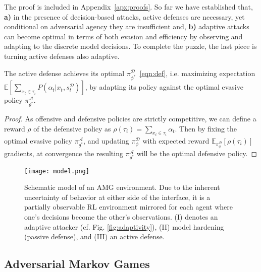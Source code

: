 

The proof is included in Appendix~\ref{apx:proofs}.
So far we have established that, \textbf{a)} in the presence of decision-based attacks, active defenses are necessary, yet conditional on adversarial agency they are insufficient and, \textbf{b)} adaptive attacks can become optimal in terms of both evasion and efficiency by observing and adapting to the discrete model decisions.
To complete the puzzle, the last piece is turning active defenses also adaptive.

\begin{corollary}
The active defense achieves its optimal $\pi_{\phi^*}^{\mathcal{D}}$~\eqref{eqn:def}, i.e. maximizing expectation $\mathbb{E}[\sum_{x_t \in \tau_i}P(\alpha_t|x_t,s^{\mathcal{D}}_t)]$, by adapting its policy against the optimal evasive policy ${\pi^\mathcal{A}_{\theta^*}}$.
\label{prop:3}
\end{corollary}

\begin{proof}
  As offensive and defensive policies are strictly competitive, we can define a reward $\rho$ of the defensive policy as $\rho(\tau_i) = \sum_{x_t \in \tau_i} \alpha_t$.
  Then by fixing the optimal evasive policy $\pi_{\theta^*}^\mathcal{A}$, and updating $\pi_\phi^{\mathcal{D}}$ with expected reward $\mathbb{E}_{\pi^\mathcal{D}_\phi}[\rho(\tau_i)]$ gradients, at convergence the resulting ${\pi^\mathcal{A}_{\theta^*}}$ will be the optimal defensive policy.
  \end{proof}

\begin{figure}
    \centering
    \texttt{[image: model.png]}
    \caption{Schematic model of an AMG environment. Due to the inherent uncertainty of behavior at either side of the interface, it is a partially observable RL environment mirrored for each agent where one's decisions become the other's observations. (I) denotes an adaptive attacker (cf. Fig. \ref{fig:adaptivity}), (II) model hardening (passive defense), and (III) an active defense.}
    \label{fig:model}
\end{figure}

\subsection{Adversarial Markov Games}
\label{sec:AMG}

